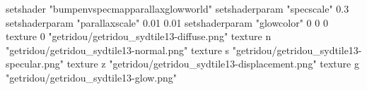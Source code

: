 setshader "bumpenvspecmapparallaxglowworld"
setshaderparam "specscale" 0.3
setshaderparam "parallaxscale" 0.01 0.01
setshaderparam "glowcolor" 0 0 0
texture 0 "getridou/getridou_sydtile13-diffuse.png"
texture n "getridou/getridou_sydtile13-normal.png"
texture s "getridou/getridou_sydtile13-specular.png"
texture z "getridou/getridou_sydtile13-displacement.png"
texture g "getridou/getridou_sydtile13-glow.png"
